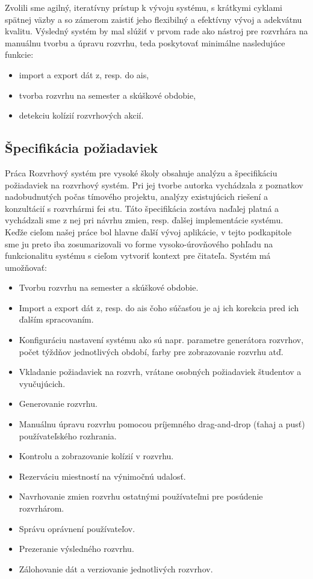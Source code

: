 Zvolili sme agilný, iteratívny prístup k vývoju systému, s krátkymi cyklami
spätnej väzby a so zámerom zaistiť jeho flexibilný a efektívny vývoj a adekvátnu
kvalitu. Výsledný systém by mal slúžiť v prvom rade ako nástroj pre rozvrhára na
manuálnu tvorbu a úpravu rozvrhu, teda poskytovať minimálne nasledujúce funkcie:

\begin{itemize}
\item import a export dát z, resp. do \acrshort{ais},
\item tvorba rozvrhu na semester a skúškové obdobie,
\item detekciu kolízií rozvrhových akcií.
\end{itemize}

\subsection{Špecifikácia požiadaviek}
\label{subsec:requirements}

Práca Rozvrhový systém pre vysoké školy \cite{knap} obsahuje analýzu a
špecifikáciu požiadaviek na rozvrhový systém. Pri jej tvorbe autorka vychádzala
z poznatkov nadobudnutých počas tímového projektu, analýzy existujúcich riešení
a konzultácií s rozvrhármi \acrshort{fei} \acrshort{stu}. Táto špecifikácia
zostáva naďalej platná a vychádzali sme z nej pri návrhu zmien, resp. ďalšej
implementácie systému. Keďže cieľom našej práce bol hlavne ďalší vývoj
aplikácie, v tejto podkapitole sme ju preto iba zosumarizovali vo forme
vysoko-úrovňového pohľadu na funkcionalitu systému s cieľom vytvoriť kontext pre
čitateľa. Systém má umožňovať:

\begin{itemize}
\item Tvorbu rozvrhu na semester a skúškové obdobie.
\item Import a export dát z, resp. do \acrshort{ais} čoho súčasťou je aj ich
  korekcia pred ich ďalším spracovaním.
\item Konfiguráciu nastavení systému ako sú napr. parametre generátora rozvrhov,
  počet týždňov jednotlivých období, farby pre zobrazovanie rozvrhu atď.
\item Vkladanie požiadaviek na rozvrh, vrátane osobných požiadaviek študentov a
  vyučujúcich.
\item Generovanie rozvrhu.
\item Manuálnu úpravu rozvrhu pomocou príjemného drag-and-drop (ťahaj a pusť)
  používateľského rozhrania.
\item Kontrolu a zobrazovanie kolízií v rozvrhu.
\item Rezerváciu miestností na výnimočnú udalosť.
\item Navrhovanie zmien rozvrhu ostatnými používateľmi pre posúdenie rozvrhárom.
\item Správu oprávnení používateľov.
\item Prezeranie výsledného rozvrhu.
\item Zálohovanie dát a verziovanie jednotlivých rozvrhov.
\end{itemize}

